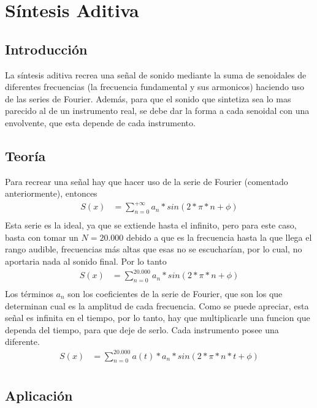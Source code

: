 \documentclass[../ASSD_TP2.tex]{subfiles}
\begin{document}
\section*{S\'intesis Aditiva}
\subsection*{Introducci\'on}
La s\'intesis aditiva recrea una señal de sonido mediante la suma de senoidales de diferentes frecuencias (la frecuencia fundamental y sus armonicos) haciendo uso de las series de Fourier. Adem\'as, para que el sonido que sintetiza sea lo mas parecido al de un instrumento real, se debe dar la forma a cada senoidal con una envolvente, que esta depende de cada instrumento.

\subsection*{Teor\'ia}
Para recrear una señal hay que hacer uso de la serie de Fourier (comentado anteriormente), entonces
\begin{align*}
  S(x) &= \sum_{n=0}^{+\infty} a_n*sin(2*\pi*n + \phi) \\
\end{align*}
Esta serie es la ideal, ya que se extiende hasta el infinito, pero para este caso, basta con tomar un $N = 20.000$ debido a que es la frecuencia hasta la que llega el rango audible, frecuencias m\'as altas que esas no se escuchar\'ian, por lo cual, no aportaria nada al sonido final. Por lo tanto
\begin{align*}
  S(x) &= \sum_{n=0}^{20.000} a_n*sin(2*\pi*n + \phi) \\
\end{align*}
Los t\'erminos $a_n$ son los coeficientes de la serie de Fourier, que son los que determinan cual es la amplitud de cada frecuencia.
Como se puede apreciar, esta señal es infinita en el tiempo, por lo tanto, hay que multiplicarle una funcion que dependa del tiempo, para que deje de serlo. Cada instrumento posee una diferente.
\begin{align*}
  S(x) &= \sum_{n=0}^{20.000}a(t)* a_n*sin(2*\pi*n*t + \phi) \\
\end{align*}
\subsection*{Aplicaci\'on}
\end{document}
